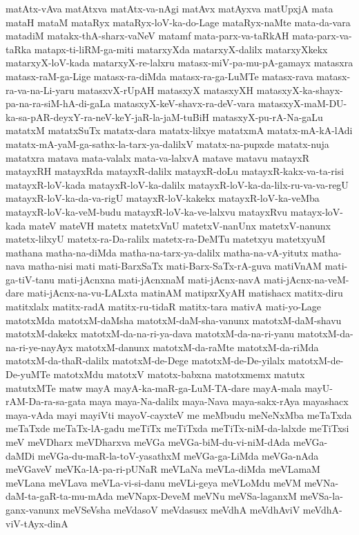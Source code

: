 {matAtx-vAva
matAtxva
matAtx-va-nAgi
matAvx
matAyxva
matUpxjA
mata
mataH
mataM
mataRyx
mataRyx-loV-ka-do-Lage
mataRyx-naMte
mata-da-vara
matadiM
matakx-thA-sharx-vaNeV
matamf
mata-parx-va-taRkAH
mata-parx-va-taRka
matapx-ti-liRM-ga-miti
matarxyXda
matarxyX-dalilx
matarxyXkekx
matarxyX-loV-kada
matarxyX-re-lalxru
matasx-miV-pa-mu-pA-gamayx
matasxra
matasx-raM-ga-Lige
matasx-ra-diMda
matasx-ra-ga-LuMTe
matasx-rava
matasx-ra-va-na-Li-yaru
matasxvX-rUpAH
matasxyX
matasxyXH
matasxyX-ka-shayx-pa-na-ra-siM-hA-di-gaLa
matasxyX-keV-shavx-ra-deV-vara
matasxyX-maM-DU-ka-sa-pAR-deyxY-ra-neV-keY-jaR-la-jaM-tuBiH
matasxyX-pu-rA-Na-gaLu
matatxM
matatxSuTx
matatx-dara
matatx-lilxye
matatxmA
matatx-mA-kA-lAdi
matatx-mA-yaM-ga-sathx-la-tarx-ya-dalilxV
matatx-na-pupxde
matatx-nuja
matatxra
matava
mata-valalx
mata-va-lalxvA
matave
matavu
matayxR
matayxRH
matayxRda
matayxR-dalilx
matayxR-doLu
matayxR-kakx-va-ta-risi
matayxR-loV-kada
matayxR-loV-ka-dalilx
matayxR-loV-ka-da-lilx-ru-va-va-regU
matayxR-loV-ka-da-va-rigU
matayxR-loV-kakekx
matayxR-loV-ka-veMba
matayxR-loV-ka-veM-budu
matayxR-loV-ka-ve-lalxvu
matayxRvu
matayx-loV-kada
mateV
mateVH
matetx
matetxVnU
matetxV-nanUnx
matetxV-nanunx
matetx-lilxyU
matetx-ra-Da-ralilx
matetx-ra-DeMTu
matetxyu
matetxyuM
mathana
matha-na-diMda
matha-na-tarx-ya-dalilx
matha-na-vA-yitutx
matha-nava
matha-nisi
mati
mati-BarxSaTx
mati-Barx-SaTx-rA-guva
matiVnAM
mati-ga-tiV-tanu
mati-jAcnxna
mati-jAcnxnaM
mati-jAcnx-navA
mati-jAcnx-na-veM-dare
mati-jAcnx-na-vu-LALxta
matinAM
matipxrXyAH
matishacx
matitx-diru
matitxlalx
matitx-radA
matitx-ru-tidaR
matitx-tara
mativA
mati-yo-Lage
matotxMda
matotxM-daMsha
matotxM-daM-sha-vanunx
matotxM-daM-shavu
matotxM-dakekx
matotxM-da-na-ri-ya-dava
matotxM-da-na-ri-yanu
matotxM-da-na-ri-ye-nayAyx
matotxM-danunx
matotxM-da-raMte
matotxM-da-riMda
matotxM-da-thaR-dalilx
matotxM-de-Dege
matotxM-de-De-yilalx
matotxM-de-De-yuMTe
matotxMdu
matotxV
matotx-babxna
matotxmemx
matutx
matutxMTe
matw
mayA
mayA-ka-maR-ga-LuM-TA-dare
mayA-mala
mayU-rAM-Da-ra-sa-gata
maya
maya-Na-dalilx
maya-Nava
maya-sakx-rAya
mayashacx
maya-vAda
mayi
mayiVti
mayoV-cayxteV
me
meMbudu
meNeNxMba
meTaTxda
meTaTxde
meTaTx-lA-gadu
meTiTx
meTiTxda
meTiTx-niM-da-lalxde
meTiTxsi
meV
meVDharx
meVDharxva
meVGa
meVGa-biM-du-vi-niM-dAda
meVGa-daMDi
meVGa-du-maR-la-toV-yasathxM
meVGa-ga-LiMda
meVGa-nAda
meVGaveV
meVKa-lA-pa-ri-pUNaR
meVLaNa
meVLa-diMda
meVLamaM
meVLana
meVLava
meVLa-vi-si-danu
meVLi-geya
meVLoMdu
meVM
meVNa-daM-ta-gaR-ta-mu-mAda
meVNapx-DeveM
meVNu
meVSa-laganxM
meVSa-la-ganx-vanunx
meVSeVsha
meVdasoV
meVdasusx
meVdhA
meVdhAviV
meVdhA-viV-tAyx-dinA
}

